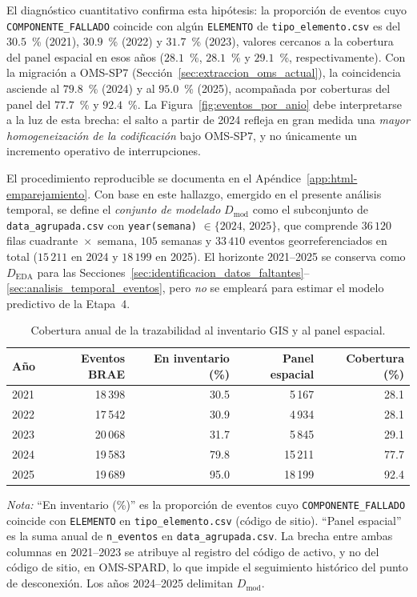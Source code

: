     El diagnóstico cuantitativo confirma esta hipótesis: la proporción de eventos cuyo \texttt{COMPONENTE\_FALLADO} coincide con algún \texttt{ELEMENTO} de \texttt{tipo\_elemento.csv} es del $30{.}5$~\% (2021), $30{.}9$~\% (2022) y $31{.}7$~\% (2023), valores cercanos a la cobertura del panel espacial en esos años ($28{.}1$~\%, $28{.}1$~\% y $29{.}1$~\%, respectivamente). Con la migración a OMS-SP7 (Sección~\ref{sec:extraccion_oms_actual}), la coincidencia asciende al $79{.}8$~\% (2024) y al $95{.}0$~\% (2025), acompañada por coberturas del panel del $77{.}7$~\% y $92{.}4$~\%. La Figura~\ref{fig:eventos_por_anio} debe interpretarse a la luz de esta brecha: el salto a partir de 2024 refleja en gran medida una \textit{mayor homogeneización de la codificación} bajo OMS-SP7, y no únicamente un incremento operativo de interrupciones.
    
    El procedimiento reproducible se documenta en el Apéndice~\ref{app:html-emparejamiento}. Con base en este hallazgo, emergido en el presente análisis temporal, se define el \textit{conjunto de modelado} $D_{\mathrm{mod}}$ como el subconjunto de \texttt{data\_agrupada.csv} con \texttt{year(semana)} $\in \{2024,\,2025\}$, que comprende $36\,120$ filas cuadrante~$\times$~semana, $105$ semanas y $33\,410$ eventos georreferenciados en total ($15\,211$ en 2024 y $18\,199$ en 2025). El horizonte 2021--2025 se conserva como $D_{\mathrm{EDA}}$ para las Secciones~\ref{sec:identificacion_datos_faltantes}--\ref{sec:analisis_temporal_eventos}, pero \textit{no} se empleará para estimar el modelo predictivo de la Etapa~4.
    
    \begin{table}[!htbp]
    \centering
\footnotesize
    \setlength{\tabcolsep}{4pt}
    \caption{Cobertura anual de la trazabilidad al inventario GIS y al panel espacial.}
    \label{tab:cobertura_emparejamiento_oms}
    \begin{tabular}{@{}l r r r r@{}}
    \toprule
    \textbf{Año} & \textbf{Eventos BRAE} & \textbf{En inventario (\%)} & \textbf{Panel espacial} & \textbf{Cobertura (\%)} \\
    \midrule
    2021 & 18\,398 & 30.5 & 5\,167  & 28.1 \\
    2022 & 17\,542 & 30.9 & 4\,934  & 28.1 \\
    2023 & 20\,068 & 31.7 & 5\,845  & 29.1 \\
    2024 & 19\,583 & 79.8 & 15\,211 & 77.7 \\
    2025 & 19\,689 & 95.0 & 18\,199 & 92.4 \\
    \bottomrule
    \end{tabular}
    
    \noindent\textit{Nota:} ``En inventario (\%)'' es la proporción de eventos cuyo \texttt{COMPONENTE\_FALLADO} coincide con \texttt{ELEMENTO} en \texttt{tipo\_elemento.csv} (código de sitio). ``Panel espacial'' es la suma anual de \texttt{n\_eventos} en \texttt{data\_agrupada.csv}. La brecha entre ambas columnas en 2021--2023 se atribuye al registro del código de activo, y no del código de sitio, en OMS-SPARD, lo que impide el seguimiento histórico del punto de desconexión. Los años 2024--2025 delimitan $D_{\mathrm{mod}}$.
\end{table}

